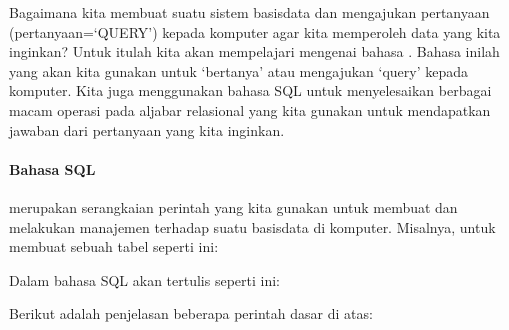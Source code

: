 \documentclass[letterpaper,10pt,english]{sphinxmanual}
\begin{document}
Bagaimana kita membuat suatu sistem basisdata dan mengajukan pertanyaan (pertanyaan=‘QUERY’) kepada komputer agar kita memperoleh data yang kita inginkan? Untuk itulah kita akan mempelajari mengenai bahasa . Bahasa inilah yang akan kita gunakan untuk ‘bertanya’ atau mengajukan ‘query’ kepada komputer. Kita juga menggunakan bahasa SQL untuk menyelesaikan berbagai macam operasi pada aljabar relasional yang kita gunakan untuk mendapatkan jawaban dari pertanyaan yang kita inginkan.


\paragraph{Bahasa SQL}
\label{\detokenize{sesi2/relationaldb:bahasa-sql}}
 merupakan serangkaian perintah yang kita gunakan untuk membuat dan melakukan manajemen terhadap suatu basisdata di komputer. Misalnya, untuk membuat sebuah tabel seperti ini:


Dalam bahasa SQL akan tertulis seperti ini:

\begin{sphinxVerbatim}[commandchars=\\\{\}]
   
	   
	 
	 
      
      
      
  
\end{sphinxVerbatim}

Berikut adalah penjelasan beberapa perintah dasar di atas:
\end{document}

